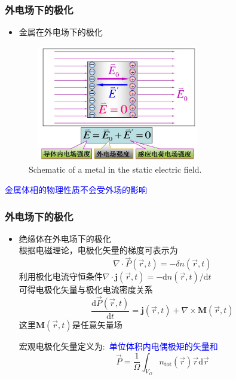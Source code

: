 \frame
{
	\frametitle{外电场下的极化}
	\begin{itemize}
		\item 金属在外电场下的极化
	\end{itemize}
\begin{figure}[h!]
\centering
\vspace*{-0.15in}
\includegraphics[height=2.0in,width=3.1in,viewport=0 0 900 650,clip]{Figures/Polarize_metal-2.png}
\caption{\tiny \textrm{Schematic of a metal in the static electric field.}}%
\label{Polarization_metal}
\end{figure} 
\textcolor{blue}{金属体相的物理性质不会受外场的影响}
}

\frame
{
	\frametitle{外电场下的极化}
	\begin{itemize}
		\item 绝缘体在外电场下的极化\\
			根据电磁理论，电极化矢量的梯度可表示为
			\begin{displaymath}
				\nabla\cdot\vec P(\vec r,t)=-\delta n(\vec r,t)
			\end{displaymath}
			利用极化电流守恒条件$\nabla\cdot\mathbf{j}(\vec r,t)=-\mathrm{d}n(\vec r,t)/\mathrm{d}t$\\
			可得电极化矢量与极化电流密度关系
			\begin{displaymath}
				\frac{\mathrm{d}\vec P(\vec r,t)}{\mathrm{d}t}=\mathbf{j}(\vec r,t)+\nabla\times\mathbf{M}(\vec r,t)
			\end{displaymath}
			这里$\mathbf{M}(\vec r,t)$是任意矢量场

			宏观电极化矢量定义为:~\textcolor{blue}{单位体积内电偶极矩的矢量和}
\begin{displaymath}
	\vec P=\dfrac1{\Omega}\int_{V_{\Omega}}n_{\mathrm{tot}}(\vec r)\vec r\mathrm{d}\vec r
\end{displaymath}
	\end{itemize}
}

